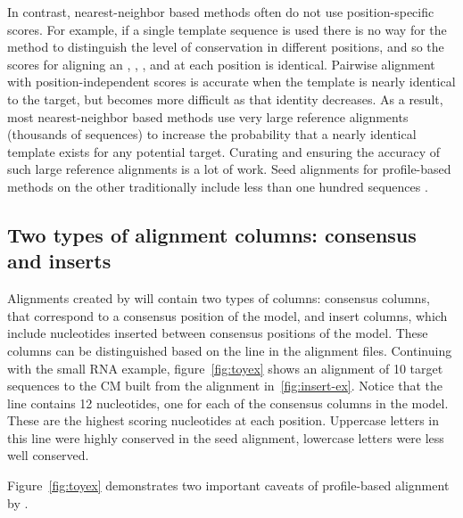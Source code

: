 In contrast, nearest-neighbor based methods often do not use
position-specific scores. For example, if a single template sequence
is used there is no way for the method to distinguish the level of
conservation in different positions, and so the scores for aligning an
, , , and  at each position is
identical.
Pairwise alignment with position-independent scores is accurate when
the template is nearly identical to the target, but becomes more
difficult as that identity decreases. As a result, most
nearest-neighbor based methods use very large reference alignments
(thousands of sequences) to increase the probability that a nearly
identical template exists for any potential target. Curating and
ensuring the accuracy of such large reference alignments is a lot of
work. Seed alignments for profile-based methods on the other
traditionally include less than one hundred sequences \cite{Finn10,Gardner09}. 

\subsection{Two types of alignment columns: consensus and inserts}

Alignments created by  will contain two types of
columns: consensus columns, that correspond to a consensus position of
the model, and insert columns, which include nucleotides
inserted between consensus positions of the model. These columns can
be distinguished based on the  line in the alignment
files. Continuing with the small RNA example, figure~\ref{fig:toyex}
shows an alignment of 10 target sequences to the CM built from the
alignment in~\ref{fig:insert-ex}. Notice that the  line
contains 12 nucleotides, one for each of the consensus columns in the model.
These are the highest scoring nucleotides at each position. Uppercase
letters in this line were highly conserved in the seed alignment,
lowercase letters were less well conserved.

Figure~\ref{fig:toyex} demonstrates two important caveats of
profile-based alignment by . 

